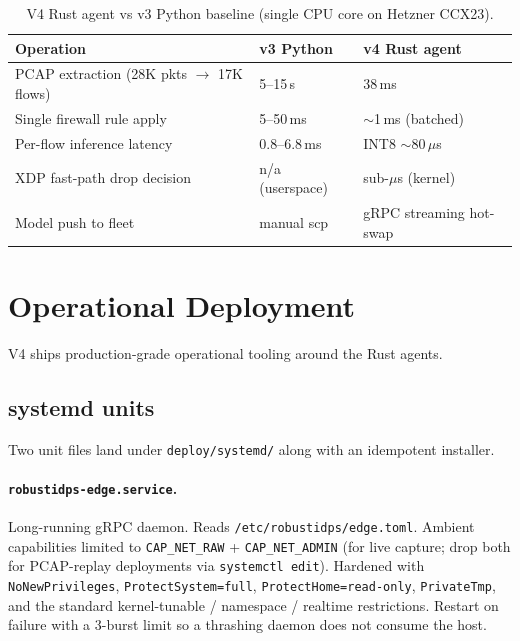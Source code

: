 \documentclass[11pt,a4paper]{article}
\begin{document}
\begin{table}[H]
\centering
\caption{V4 Rust agent vs v3 Python baseline (single CPU core on
  Hetzner CCX23).}
\label{tab:rust_perf}
\small
\begin{tabular}{@{}lll@{}}
\toprule
\textbf{Operation} & \textbf{v3 Python} & \textbf{v4 Rust agent} \\
\midrule
PCAP extraction (28K pkts $\to$ 17K flows) & 5--15\,s        & 38\,ms             \\
Single firewall rule apply                 & 5--50\,ms       & $\sim$1\,ms (batched) \\
Per-flow inference latency                 & 0.8--6.8\,ms    & INT8 $\sim$80\,$\mu$s \\
XDP fast-path drop decision                & n/a (userspace) & sub-$\mu$s (kernel) \\
Model push to fleet                        & manual scp      & gRPC streaming hot-swap \\
\bottomrule
\end{tabular}
\end{table}

\section{Operational Deployment}
\label{sec:deployment}

V4 ships production-grade operational tooling around the Rust agents.

\subsection{systemd units}

Two unit files land under \texttt{deploy/systemd/} along with an
idempotent installer.

\paragraph{\texttt{robustidps-edge.service}.}
Long-running gRPC daemon.  Reads \texttt{/etc/robustidps/edge.toml}.
Ambient capabilities limited to \texttt{CAP\_NET\_RAW} +
\texttt{CAP\_NET\_ADMIN} (for live capture; drop both for PCAP-replay
deployments via \texttt{systemctl edit}).  Hardened with
\texttt{NoNewPrivileges}, \texttt{ProtectSystem=full},
\texttt{ProtectHome=read-only}, \texttt{PrivateTmp}, and the standard
kernel-tunable / namespace / realtime restrictions.  Restart on
failure with a 3-burst limit so a thrashing daemon does not consume
the host.
\end{document}
